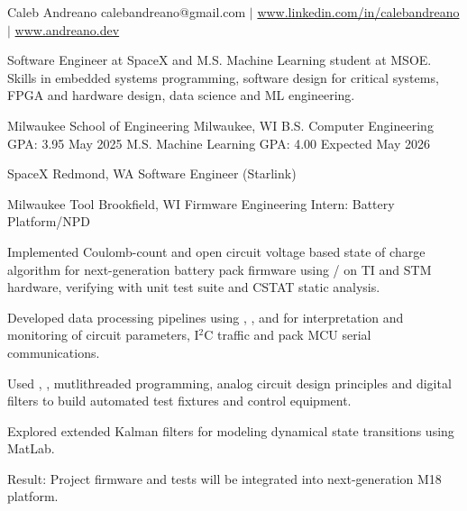 \documentclass[11pt]{article}
\begin{document}

\namestuff 
{Caleb Andreano}
{calebandreano@gmail.com $|$ \url{www.linkedin.com/in/calebandreano} $|$ \url{www.andreano.dev}}

\rootstart{}
Software Engineer at SpaceX and M.S. Machine Learning student at MSOE.
Skills in embedded systems programming, software design for critical systems, FPGA and hardware design, data science and ML engineering.

\rootend


\sectiongpa
{Milwaukee School of Engineering} {Milwaukee, WI}
{B.S. Computer Engineering} {GPA: 3.95} {May 2025}
{M.S. Machine Learning} {GPA: 4.00} {Expected May 2026}

\rootend


\sectionloc
{SpaceX} {Redmond, WA}
{Software Engineer (Starlink)} {}
{}

\sectionloc
{Milwaukee Tool} {Brookfield, WI}
{Firmware Engineering Intern: Battery Platform/NPD} {}
{\begin{circlist}
  \item Implemented Coulomb-count and open circuit voltage based state of charge algorithm for next-generation battery pack firmware using / on TI and STM hardware, verifying with unit test suite and CSTAT static analysis.
  \item Developed data processing pipelines using , ,  and  for interpretation and monitoring of circuit parameters, I$^2$C traffic and pack MCU serial communications.
  \item Used , , mutlithreaded programming, analog circuit design principles and digital filters to build automated test fixtures and control equipment.
  \item Explored extended Kalman filters for modeling dynamical state transitions using MatLab.
  \item Result: Project firmware and tests will be integrated into next-generation M18 platform.
\end{circlist}}
\end{document}

